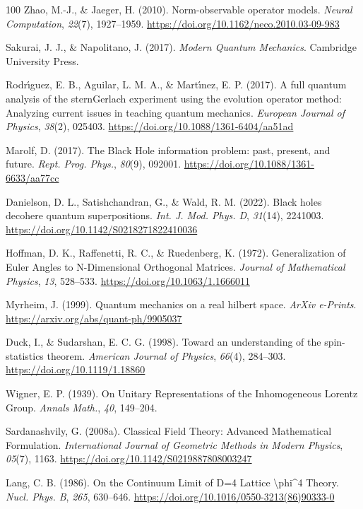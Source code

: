 \documentclass[11pt]{book}
\begin{document}
\begin{thebibliography}{100}
 Zhao, M.-J., \& Jaeger, H. (2010). Norm-observable operator models.
\emph{Neural Computation}, \emph{22}(7), 1927--1959.
\url{https://doi.org/10.1162/neco.2010.03-09-983}

 Sakurai, J. J., \& Napolitano, J. (2017). \emph{Modern Quantum
Mechanics}. Cambridge University Press.

 Rodrı́guez, E. B., Aguilar, L. M. A., \& Martı́nez, E. P. (2017). A full
quantum analysis of the sternGerlach experiment using the evolution
operator method: Analyzing current issues in teaching quantum mechanics.
\emph{European Journal of Physics}, \emph{38}(2), 025403.
\url{https://doi.org/10.1088/1361-6404/aa51ad}

 Marolf, D. (2017). The Black Hole information problem: past, present,
and future. \emph{Rept. Prog. Phys.}, \emph{80}(9), 092001.
\url{https://doi.org/10.1088/1361-6633/aa77cc}

 Danielson, D. L., Satishchandran, G., \& Wald, R. M. (2022). Black holes
decohere quantum superpositions. \emph{Int. J. Mod. Phys. D},
\emph{31}(14), 2241003. \url{https://doi.org/10.1142/S0218271822410036}

 Hoffman, D. K., Raffenetti, R. C., \& Ruedenberg, K. (1972).
Generalization of Euler Angles to N-Dimensional Orthogonal Matrices.
\emph{Journal of Mathematical Physics}, \emph{13}, 528--533.
\url{https://doi.org/10.1063/1.1666011}

 Myrheim, J. (1999). Quantum mechanics on a real hilbert space.
\emph{ArXiv e-Prints}. \url{https://arxiv.org/abs/quant-ph/9905037}

 Duck, I., \& Sudarshan, E. C. G. (1998). Toward an understanding of the
spin-statistics theorem. \emph{American Journal of Physics},
\emph{66}(4), 284--303. \url{https://doi.org/10.1119/1.18860}

 Wigner, E. P. (1939). On Unitary Representations of the Inhomogeneous
Lorentz Group. \emph{Annals Math.}, \emph{40}, 149--204.

 Sardanashvily, G. (2008a). Classical Field Theory: Advanced Mathematical
Formulation. \emph{International Journal of Geometric Methods in Modern
Physics}, \emph{05}(7), 1163.
\url{https://doi.org/10.1142/S0219887808003247}

 Lang, C. B. (1986). On the Continuum Limit of D=4 Lattice
\textbackslash phi\^{}4 Theory. \emph{Nucl. Phys. B}, \emph{265},
630--646. \url{https://doi.org/10.1016/0550-3213(86)90333-0}


\end{thebibliography}
\end{document}
